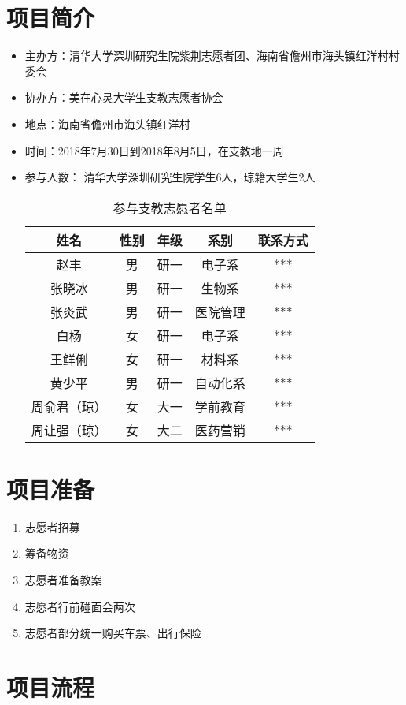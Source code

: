 \documentclass[12pt]{ctexart}
\begin{document}
\section{项目简介}
\begin{itemize}
\item 主办方：清华大学深圳研究生院紫荆志愿者团、海南省儋州市海头镇红洋村村委会
\item 协办方：美在心灵大学生支教志愿者协会
\item 地点：海南省儋州市海头镇红洋村
\item 时间：2018年7月30日到2018年8月5日，在支教地一周
\item 参与人数： 清华大学深圳研究生院学生6人，琼籍大学生2人
\begin{table}[!ht]
\centering
\begin{tabular}{|c|c|c|c|c|}
\hline
姓名 & 性别 & 年级 & 系别 & 联系方式\\
\hline
赵丰 & 男 & 研一 & 电子系 &  ***\\
\hline
张晓冰  &	男	& 研一 &  生物系 &  ***\\
\hline
张炎武 & 男 & 研一 & 医院管理 & ***\\
\hline
白杨 & 女 & 研一 & 电子系 & *** \\
\hline
王鲜俐 & 女 & 研一 & 材料系 & ***\\
\hline
黄少平 & 男 & 研一 & 自动化系 & ***\\
\hline
周俞君（琼） & 女 & 大一 & 学前教育 &  ***\\
\hline
周让强（琼） & 女 & 大二 & 医药营销 &  ***\\
\hline
\end{tabular}
\caption{参与支教志愿者名单}
\end{table}
\end{itemize}
\section{项目准备}
\begin{enumerate}
\item 志愿者招募
\item 筹备物资
\item 志愿者准备教案
\item 志愿者行前碰面会两次
\item 志愿者部分统一购买车票、出行保险
\end{enumerate}
\section{项目流程}
\end{document}

